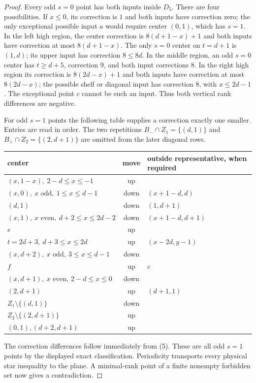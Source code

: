 \documentclass[11pt]{article}
\begin{document}
\begin{proof}
Every odd $s=0$ point has both inputs inside $D_5$. There are four
possibilities. If $x\le0$, its correction is $1$ and both inputs have
correction zero; the only exceptional possible input $a$ would require
center $(0,1)$, which has $s=1$. In the left high region, the center
correction is $8(d+1-x)+1$ and both inputs have correction at most
$8(d+1-x)$. The only $s=0$ center on $t=d+1$ is $(1,d)$; its upper
input has correction $8\le8d$. In the middle region, an odd $s=0$
center has $t\ge d+5$, correction $9$, and both input corrections $8$.
In the right high region its correction is $8(2d-x)+1$ and both inputs
have correction at most $8(2d-x)$; the possible shelf or diagonal input
has correction $8$, with $x\le2d-1$. The exceptional point $c$ cannot
be such an input. Thus both vertical rank differences are negative.

For odd $s=1$ points the following table supplies a correction exactly
one smaller. Entries are read in order. The two repetitions
$B_-\cap Z_1=\{(d,1)\}$ and $B_+\cap Z_2=\{(2,d+1)\}$ are omitted
from the later diagonal rows.
\begin{center}\small
\begin{longtable}{lcl}
center&move&outside representative, when required\\\hline
$(x,1-x),\ 2-d\le x\le-1$&up&\\
$(x,0),\ x\text{ odd},\ 1\le x\le d-1$&down&$(x+1-d,d)$\\
$(d,1)$&down&$(1,d+1)$\\
$(x,1),\ x\text{ even},\ d+2\le x\le2d-2$&down&$(x+1-d,d+1)$\\
$e$&up&\\
$t=2d+3,\ d+3\le x\le2d$&up&$(x-2d,y-1)$\\
$(x,d+2),\ x\text{ odd},\ 3\le x\le d-1$&down&\\
$f$&up&$c$\\
$(x,d+1),\ x\text{ even},\ 2-d\le x\le0$&down&\\
$(2,d+1)$&up&$(d+1,1)$\\
$Z_1\setminus\{(d,1)\}$&down&\\
$Z_2\setminus\{(2,d+1)\}$&up&\\
$(0,1),(d+2,d+1)$&up&
\end{longtable}\end{center}
The correction differences follow immediately from (5). These are all
odd $s=1$ points by the displayed exact classification. Periodicity
transports every physical star inequality to the plane. A minimal-rank
point of a finite nonempty forbidden set now gives a contradiction.
\end{proof}
\end{document}
